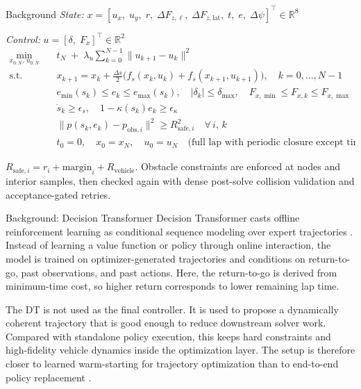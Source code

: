 \documentclass[final]{beamer}
\newlength{\colwidth}
\begin{document}
\begin{frame}[t]
\begin{columns}[t]
\begin{column}{\colwidth}
\begin{block}{Background}
\textit{State:} $x = [u_x,\;u_y,\;r,\;\Delta F_{z,\ell},\;\Delta F_{z,\mathrm{lat}},\;t,\;e,\;\Delta\psi]^\top \in \mathbb{R}^{8}$

\textit{Control:} $u = [\delta,\;F_x]^\top \in \mathbb{R}^{2}$
\begin{align*}
 \min_{x_{0:N},\,u_{0:N}} \quad & t_N \;+\; \lambda_u\sum_{k=0}^{N-1}\lVert u_{k+1}-u_k\rVert^2 \\[4pt]
\text{s.t.} \quad
& x_{k+1} = x_k + \frac{\Delta s}{2}\Big(f_s(x_k,u_k)+f_s(x_{k+1},u_{k+1})\Big), \quad k=0,\dots,N-1 \\
& e_{\min}(s_k)\le e_k\le e_{\max}(s_k),\quad |\delta_k|\le\delta_{\max},\quad F_{x,\min}\le F_{x,k}\le F_{x,\max} \\
& \dot{s}_k \ge \epsilon_s,\quad 1-\kappa(s_k)e_k \ge \epsilon_\kappa \\
& \lVert p(s_k,e_k)-p_{\mathrm{obs},i}\rVert^2 \ge R_{\mathrm{safe},i}^2 \quad \forall\,i,\,k \\
& t_0 = 0,\quad x_0 = x_N,\quad u_0 = u_N \quad \text{(full lap with periodic closure except time)}
\end{align*}

$R_{\mathrm{safe},i} = r_i + \mathrm{margin}_i + R_{\mathrm{vehicle}}$. Obstacle constraints are enforced at nodes and interior samples, then checked again with dense post-solve collision validation and acceptance-gated retries.
\end{block}

\begin{block}{Background: Decision Transformer}
Decision Transformer casts offline reinforcement learning as conditional sequence modeling over expert trajectories \cite{chen2021decision}. Instead of learning a value function or policy through online interaction, the model is trained on optimizer-generated trajectories and conditions on return-to-go, past observations, and past actions. Here, the return-to-go is derived from minimum-time cost, so higher return corresponds to lower remaining lap time.

The DT is not used as the final controller. It is used to propose a dynamically coherent trajectory that is good enough to reduce downstream solver work. Compared with standalone policy execution, this keeps hard constraints and high-fidelity vehicle dynamics inside the optimization layer. The setup is therefore closer to learned warm-starting for trajectory optimization than to end-to-end policy replacement \cite{guffanti2024transformers}.
\end{block}


\end{column}
\end{columns}
\end{frame}
\end{document}
